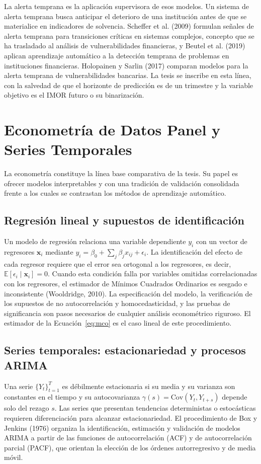 La alerta temprana es la aplicación supervisora de esos modelos. Un sistema de alerta temprana busca anticipar el deterioro de una institución antes de que se materialice en indicadores de solvencia. Scheffer et al. (2009) formulan señales de alerta temprana para transiciones críticas en sistemas complejos, concepto que se ha trasladado al análisis de vulnerabilidades financieras, y Beutel et al. (2019) aplican aprendizaje automático a la detección temprana de problemas en instituciones financieras. Holopainen y Sarlin (2017) comparan modelos para la alerta temprana de vulnerabilidades bancarias. La tesis se inscribe en esta línea, con la salvedad de que el horizonte de predicción es de un trimestre y la variable objetivo es el IMOR futuro o su binarización.

\section{Econometría de Datos Panel y Series Temporales}

La econometría constituye la línea base comparativa de la tesis. Su papel es ofrecer modelos interpretables y con una tradición de validación consolidada frente a los cuales se contrastan los métodos de aprendizaje automático.

\subsection{Regresión lineal y supuestos de identificación}
Un modelo de regresión relaciona una variable dependiente $y_i$ con un vector de regresores $\mathbf{x}_i$ mediante $y_i = \beta_0 + \sum_j \beta_j x_{ij} + \epsilon_i$. La identificación del efecto de cada regresor requiere que el error sea ortogonal a los regresores, es decir, $\mathbb{E}[\epsilon_i \mid \mathbf{x}_i] = 0$. Cuando esta condición falla por variables omitidas correlacionadas con los regresores, el estimador de Mínimos Cuadrados Ordinarios es sesgado e inconsistente (Wooldridge, 2010). La especificación del modelo, la verificación de los supuestos de no autocorrelación y homocedasticidad, y las pruebas de significancia son pasos necesarios de cualquier análisis econométrico riguroso. El estimador de la Ecuación~\eqref{eq:mco} es el caso lineal de este procedimiento.

\subsection{Series temporales: estacionariedad y procesos ARIMA}
Una serie $\{Y_t\}_{t=1}^T$ es débilmente estacionaria si su media y su varianza son constantes en el tiempo y su autocovarianza $\gamma(s)=\text{Cov}(Y_t,Y_{t+s})$ depende solo del rezago $s$. Las series que presentan tendencias deterministas o estocásticas requieren diferenciación para alcanzar estacionariedad. El procedimiento de Box y Jenkins (1976) organiza la identificación, estimación y validación de modelos ARIMA a partir de las funciones de autocorrelación (ACF) y de autocorrelación parcial (PACF), que orientan la elección de los órdenes autorregresivo y de media móvil.

